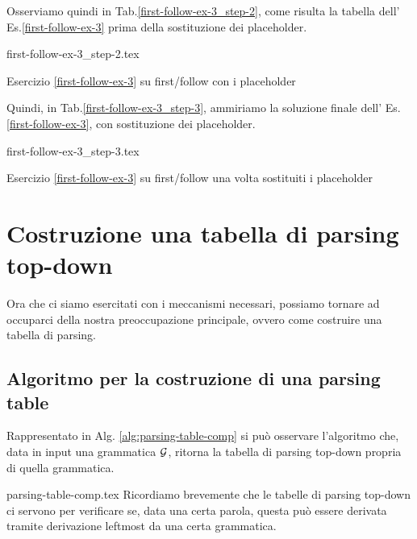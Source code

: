 \documentclass[class=book, crop=false, oneside, 12pt]{standalone}
\begin{document}
Osserviamo quindi in Tab.\ref{first-follow-ex-3_step-2}, come risulta la tabella dell' Es.\ref{first-follow-ex-3} prima della sostituzione dei placeholder.
\begin{table}[H]
	\centering
	{first-follow-ex-3_step-2.tex}
    \caption{Esercizio \ref{first-follow-ex-3} su first/follow con i placeholder}
    \label{first-follow-ex-3_step-2}
\end{table}
Quindi, in Tab.\ref{first-follow-ex-3_step-3}, ammiriamo la soluzione finale dell' Es.\ref{first-follow-ex-3}, con sostituzione dei placeholder.
\begin{table}[H]
	\centering
	{first-follow-ex-3_step-3.tex}
    \caption{Esercizio \ref{first-follow-ex-3} su first/follow una volta sostituiti i placeholder}
    \label{first-follow-ex-3_step-3}
\end{table}

\section{Costruzione una tabella di parsing top-down}
Ora che ci siamo esercitati con i meccanismi necessari, possiamo tornare ad occuparci della nostra preoccupazione principale, ovvero come costruire una tabella di parsing.

\subsection{Algoritmo per la costruzione di una parsing table}
Rappresentato in Alg. \ref{alg:parsing-table-comp} si può osservare l'algoritmo che, data in input una grammatica \(\mathcal{G}\), ritorna la tabella di parsing top-down propria di quella grammatica. 

{parsing-table-comp.tex}
Ricordiamo brevemente che le tabelle di parsing top-down ci servono per verificare se, data una certa parola, questa può essere derivata tramite derivazione leftmost da una certa grammatica.
\end{document}
